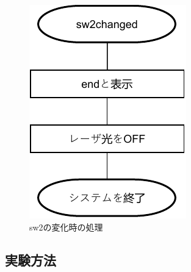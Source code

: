 \documentclass{jarticle}
\begin{document}
\begin{figure}[H]
    \centering
    \includegraphics{kadai5setDrawArea-sw2.pdf}
    \caption{sw2の変化時の処理}
    \label{fig:my_label}
\end{figure}


\subsection{実験方法}
\end{document}
